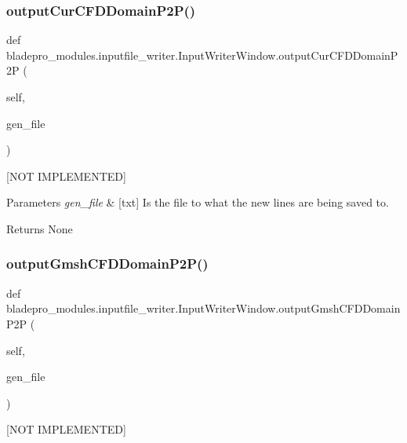\subsubsection{\texorpdfstring{output\+Cur\+C\+F\+D\+Domain\+P2\+P()}{outputCurCFDDomainP2P()}}
{\footnotesize\ttfamily def bladepro\+\_\+modules.\+inputfile\+\_\+writer.\+Input\+Writer\+Window.\+output\+Cur\+C\+F\+D\+Domain\+P2P (\begin{DoxyParamCaption}\item[{}]{self,  }\item[{}]{gen\+\_\+file }\end{DoxyParamCaption})}



\mbox{[}N\+OT I\+M\+P\+L\+E\+M\+E\+N\+T\+ED\mbox{]} 


\begin{DoxyParams}{Parameters}
{\em gen\+\_\+file} & \mbox{[}txt\mbox{]} Is the file to what the new lines are being saved to. \\
\hline
\end{DoxyParams}
\begin{DoxyReturn}{Returns}
None 
\end{DoxyReturn}
\hypertarget{a00070_a998cb328088bc95e267cffed35c231ce}{}\label{a00070_a998cb328088bc95e267cffed35c231ce} 
\subsubsection{\texorpdfstring{output\+Gmsh\+C\+F\+D\+Domain\+P2\+P()}{outputGmshCFDDomainP2P()}}
{\footnotesize\ttfamily def bladepro\+\_\+modules.\+inputfile\+\_\+writer.\+Input\+Writer\+Window.\+output\+Gmsh\+C\+F\+D\+Domain\+P2P (\begin{DoxyParamCaption}\item[{}]{self,  }\item[{}]{gen\+\_\+file }\end{DoxyParamCaption})}



\mbox{[}N\+OT I\+M\+P\+L\+E\+M\+E\+N\+T\+ED\mbox{]} 


